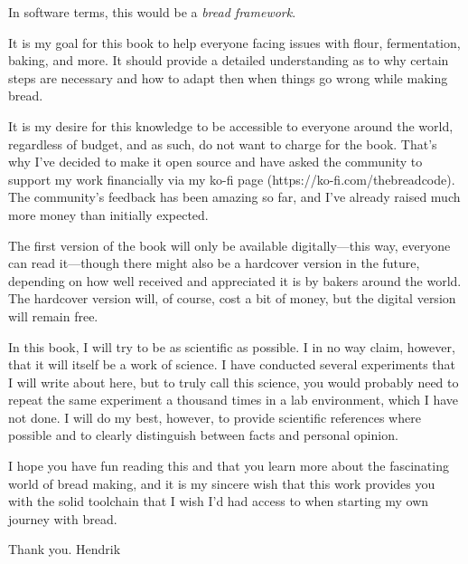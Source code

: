 In software terms, this would be a {\it bread framework}.

It is my goal for this book to help everyone facing issues with flour, fermentation, baking,
and more. It should provide a detailed understanding as to why certain steps are necessary
and how to adapt then when things go wrong while making bread.

It is my desire for this knowledge to be accessible to everyone around the world, regardless
of budget, and as such, do not want to charge for the book. That's why I've decided to make
it open source and have asked the community to support my work financially via my ko-fi page
(https://ko-fi.com/thebreadcode). The community's feedback has been amazing so far, and
I've already raised much more money than initially expected.

The first version of the book will only be available digitally---this way, everyone can read
it---though there might also be a hardcover version in the future, depending on how well received
and appreciated it is by bakers around the world. The hardcover version will, of course, cost a
bit of money, but the digital version will remain free.

In this book, I will try to be as scientific as possible. I in no way claim, however, that
it will itself be a work of science. I have conducted several experiments that I will write
about here, but to truly call this science, you would probably need to repeat the same experiment
a thousand times in a lab environment, which I have not done. I will do my best, however, to provide
scientific references where possible and to clearly distinguish between facts and personal opinion.

I hope you have fun reading this and that you learn more about the fascinating world of bread
making, and it is my sincere wish that this work provides you with the solid toolchain that I wish
I'd had access to when starting my own journey with bread.

Thank you.
Hendrik